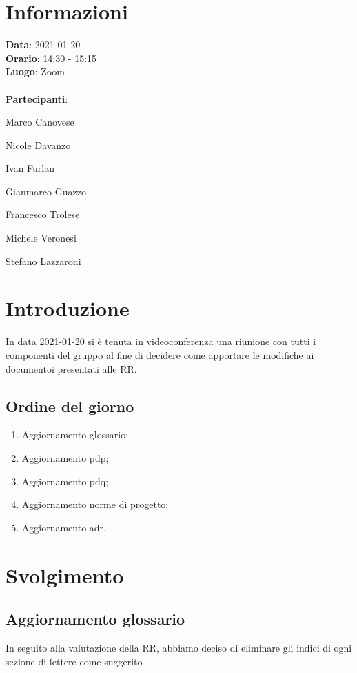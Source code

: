 \section{Informazioni}
\textbf{Data}: 2021-01-20\\
\textbf{Orario}: 14:30 - 15:15\\
\textbf{Luogo}: Zoom\\\\
\textbf{Partecipanti}:\begin{list}{*}{\setlength{\itemsep}{0cm}}
	\item Marco Canovese
	\item Nicole Davanzo
	\item Ivan Furlan
	\item Gianmarco Guazzo
	\item Francesco Trolese
	\item Michele Veronesi
	\item Stefano Lazzaroni
\end{list}

\section{Introduzione}
In data 2021-01-20 si è tenuta in videoconferenza una riunione con tutti i componenti del gruppo al fine di decidere come apportare le modifiche ai documentoi presentati alle RR.

\subsection{Ordine del giorno}
\begin{enumerate}
    \item Aggiornamento glossario;
    \item Aggiornamento pdp;
    \item Aggiornamento pdq;
    \item Aggiornamento norme di progetto;
    \item Aggiornamento adr.
\end{enumerate}

\section{Svolgimento}
\subsection{Aggiornamento glossario}
In seguito alla valutazione della RR, abbiamo deciso di eliminare gli indici di ogni sezione di lettere come suggerito .

